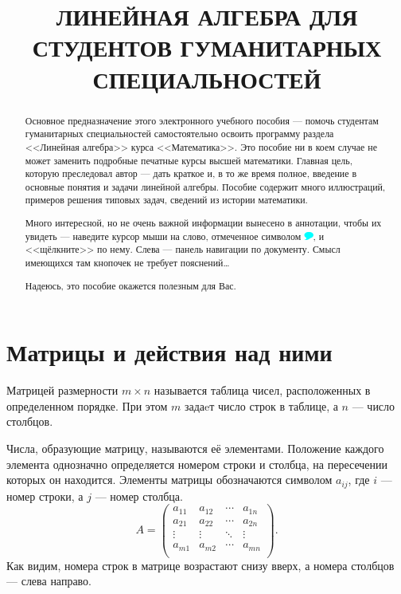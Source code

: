 \documentclass[10pt]{article}
\title{\bf ЛИНЕЙНАЯ АЛГЕБРА ДЛЯ СТУДЕНТОВ ГУМАНИТАРНЫХ СПЕЦИАЛЬНОСТЕЙ}
\author{\tooltip{Михеев~А.\,В.}{ya}}
\date{}
\newenvironment{defnt}%
{\begin{center}\fboxsep=1.6\fboxrule \shadowsize=4pt\begin{Sbox}
\begin{minipage}[c]{0.58\textwidth}}%
{\end{minipage}\end{Sbox}\shadowbox{\fboxsep=5pt\colorbox[rgb]{1,0.725,0.474}{\TheSbox}}
\end{center}}
\numberwithin{primer}{section}
\numberwithin{equation}{section}
\begin{document}
\maketitle

\thispagestyle{empty}
\begin{abstract}
%
%
Основное предназначение этого электронного учебного пособия --- помочь студентам гуманитарных специальностей самостоятельно освоить программу раздела <<Линейная алгебра>> курса <<Математика>>. Это пособие ни в коем случае не может заменить подробные печатные курсы высшей математики. Главная цель, которую преследовал автор --- дать краткое и, в то же время полное, введение в основные понятия и задачи линейной алгебры. Пособие содержит много иллюстраций, примеров решения типовых задач, сведений из истории математики. 

Много интересной, но не очень важной информации вынесено в аннотации, чтобы их увидеть --- наведите курсор мыши на слово, отмеченное символом \includegraphics[width=0.3cm]{fancytipmark.pdf}, и <<щёлкните>> по нему. Слева --- панель навигации по документу. Смысл имеющихся там кнопочек не требует пояснений\dots 

Надеюсь, это пособие окажется полезным для Вас.
\end{abstract}\newpage
\hypertarget{cont}{\tableofcontents}\newpage
\section{Матрицы и действия над ними}

\begin{defnt}
Матрицей размерности $m\times n$ называется таблица чисел,
расположенных в определенном порядке. При этом $m$ задаeт число
строк в таблице, а $n$ --- число столбцов.
\end{defnt}


Числа, образующие матрицу, называются её элементами. Положение
каждого элемента однозначно определяется номером строки и столбца,
на пересечении которых он находится. Элементы матрицы обозначаются
символом $a_{ij}$, где $i$ --- номер строки, а $j$ --- номер
столбца.
\begin{equation}\label{eq:matrix}
A = \begin{pmatrix}
  a_{11} & a_{12} & \cdots & a_{1n} \\
  a_{21} & a_{22} & \cdots & a_{2n} \\
  \vdots & \vdots & \ddots & \vdots \\
  a_{m1} & a_{m2} & \cdots & a_{mn} \\
\end{pmatrix}.
\end{equation}
Как видим, номера строк в матрице возрастают снизу вверх, а номера
столбцов --- слева направо.
\end{document}
